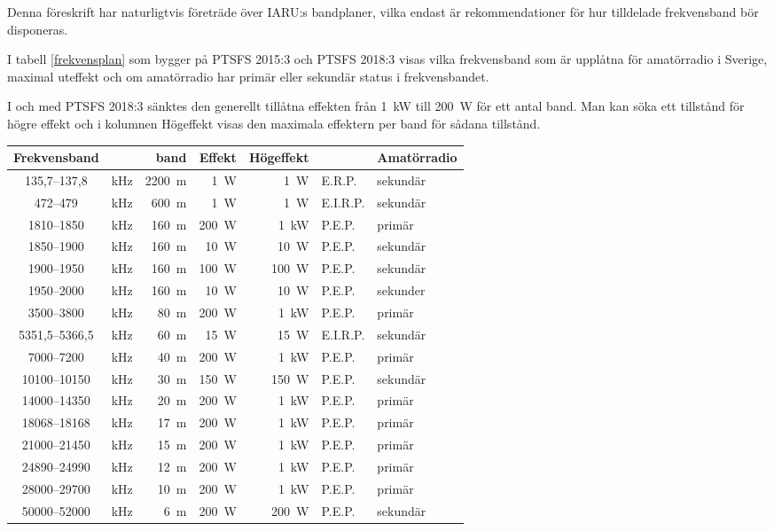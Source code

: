 Denna föreskrift har naturligtvis företräde över IARU:s bandplaner, vilka
endast är rekommendationer för hur tilldelade frekvensband bör disponeras.

I tabell \ref{frekvensplan} som bygger på PTSFS 2015:3 och PTSFS 2018:3 visas
vilka frekvensband som är upplåtna för amatörradio i Sverige, maximal uteffekt
och om amatörradio har primär eller sekundär status i frekvensbandet.

I och med PTSFS 2018:3 sänktes den generellt tillåtna effekten från 1~kW till
200~W för ett antal band. Man kan söka ett tillstånd för högre effekt och i
kolumnen Högeffekt visas den maximala effektern per band för sådana tillstånd.

\begin{table*}[b!]
  \centering
\caption{Frekvensband för amatörradio i Sverige}
\label{frekvensplan}
\begin{tabular}{clr|rrl|l}
Frekvensband &  & band & Effekt & Högeffekt & & Amatörradio\\ \hline
135,7--137,8 & kHz & 2200~m & 1~W & 1~W & E.R.P. & sekundär\\
472--479 & kHz & 600~m & 1~W & 1~W & E.I.R.P. & sekundär\\
1810--1850 & kHz & 160~m & 200~W & 1~kW & P.E.P. & primär\\
1850--1900 & kHz & 160~m & 10~W & 10~W & P.E.P. & sekundär\\
1900--1950 & kHz & 160~m & 100~W & 100~W & P.E.P. & sekundär\\
1950--2000 & kHz & 160~m & 10~W & 10~W & P.E.P. & sekunder\\
3500--3800 & kHz & 80~m  & 200~W & 1~kW & P.E.P. & primär\\
5351,5--5366,5 & kHz & 60~m & 15~W & 15~W & E.I.R.P. & sekundär\\
7000--7200 & kHz & 40~m  & 200~W & 1~kW & P.E.P. & primär\\
10100--10150 & kHz & 30~m & 150~W & 150~W & P.E.P. & sekundär\\
14000--14350 & kHz & 20~m & 200~W & 1~kW & P.E.P. & primär\\
18068--18168 & kHz & 17~m & 200~W & 1~kW & P.E.P. & primär\\
21000--21450 & kHz & 15~m & 200~W & 1~kW & P.E.P. & primär\\
24890--24990 & kHz & 12~m & 200~W & 1~kW & P.E.P. & primär\\
28000--29700 & kHz & 10~m & 200~W & 1~kW & P.E.P. & primär\\
50000--52000 & kHz & 6~m & 200~W & 200~W & P.E.P. & sekundär\\ \hline

\end{tabular}
\end{table*}
